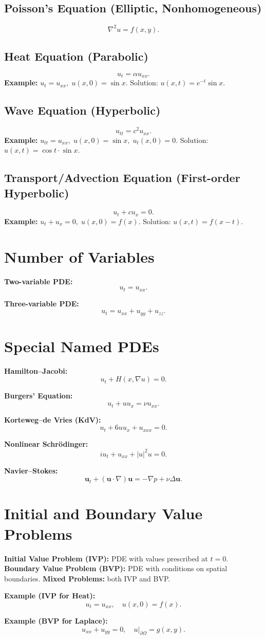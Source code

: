 \documentclass[12pt]{book}
\begin{document}
\section*{Poisson’s Equation (Elliptic, Nonhomogeneous)}
\[
\nabla^2 u = f(x,y).
\]

\section*{Heat Equation (Parabolic)}
\[
u_t = \alpha u_{xx}.
\]
\textbf{Example:} $u_t = u_{xx}, \; u(x,0) = \sin x$.  
Solution: $u(x,t) = e^{-t}\sin x$.

\section*{Wave Equation (Hyperbolic)}
\[
u_{tt} = c^2 u_{xx}.
\]
\textbf{Example:} $u_{tt} = u_{xx}, \; u(x,0) = \sin x, \; u_t(x,0)=0$.  
Solution: $u(x,t) = \cos t \cdot \sin x$.

\section*{Transport/Advection Equation (First-order Hyperbolic)}
\[
u_t + c u_x = 0.
\]
\textbf{Example:} $u_t + u_x = 0, \; u(x,0) = f(x)$.  
Solution: $u(x,t) = f(x-t)$.

\chapter{Number of Variables}
\textbf{Two-variable PDE:}
\[
u_t = u_{xx}.
\]

\textbf{Three-variable PDE:}
\[
u_t = u_{xx}+u_{yy}+u_{zz}.
\]

\chapter{Special Named PDEs}
\textbf{Hamilton--Jacobi:}
\[
u_t + H(x,\nabla u) = 0.
\]

\textbf{Burgers’ Equation:}
\[
u_t + u u_x = \nu u_{xx}.
\]

\textbf{Korteweg--de Vries (KdV):}
\[
u_t + 6u u_x + u_{xxx} = 0.
\]

\textbf{Nonlinear Schr\"odinger:}
\[
i u_t + u_{xx} + |u|^2 u = 0.
\]

\textbf{Navier--Stokes:}
\[
\mathbf{u}_t + (\mathbf{u}\cdot\nabla)\mathbf{u} = -\nabla p + \nu \Delta \mathbf{u}.
\]

\chapter{Initial and Boundary Value Problems}
\textbf{Initial Value Problem (IVP):} PDE with values prescribed at $t=0$.  
\textbf{Boundary Value Problem (BVP):} PDE with conditions on spatial boundaries.  
\textbf{Mixed Problems:} both IVP and BVP.

\textbf{Example (IVP for Heat):}
\[
u_t = u_{xx}, \quad u(x,0) = f(x).
\]

\textbf{Example (BVP for Laplace):}
\[
u_{xx} + u_{yy} = 0, \quad u|_{\partial \Omega} = g(x,y).
\]
\end{document}
